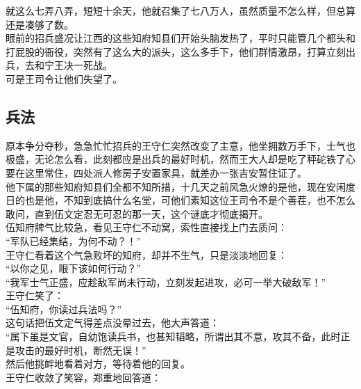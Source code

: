 \begin{multicols}{\theparacolNo}
就这么七弄八弄，短短十余天，他就召集了七八万人，虽然质量不怎么样，但总算还是凑够了数。\\

眼前的招兵盛况让江西的这些知府知县们开始头脑发热了，平时只能管几个都头和打屁股的衙役，突然有了这么大的派头，这么多手下，他们群情激昂，打算立刻出兵，去和宁王决一死战。\\

可是王司令让他们失望了。\\

\subsection{兵法}
原本争分夺秒，急急忙忙招兵的王守仁突然改变了主意，他坐拥数万手下，士气也极盛，无论怎么看，此刻都应是出兵的最好时机，然而王大人却是吃了秤砣铁了心要在这里常住，四处派人修房子安置家具，就差办一张吉安暂住证了。\\

他下属的那些知府知县们全都不知所措，十几天之前风急火燎的是他，现在安闲度日的也是他，不知到底搞什么名堂，可他们素知这位王司令不是个善茬，也不怎么敢问，直到伍文定忍无可忍的那一天，这个谜底才彻底揭开。\\

伍知府脾气比较急，看见王守仁不动窝，索性直接找上门去质问：\\

“军队已经集结，为何不动？！”\\

王守仁看着这个气急败坏的知府，却并不生气，只是淡淡地回复：\\

“以你之见，眼下该如何行动？”\\

“我军士气正盛，应趁敌军尚未行动，立刻发起进攻，必可一举大破敌军！”\\

王守仁笑了：\\

“伍知府，你读过兵法吗？”\\

这句话把伍文定气得差点没晕过去，他大声答道：\\

“属下虽是文官，自幼饱读兵书，也甚知韬略，所谓出其不意，攻其不备，此时正是攻击的最好时机，断然无误！”\\

然后他挑衅地看着对方，等待着他的回复。\\

王守仁收敛了笑容，郑重地回答道：\\


\end{multicols}
